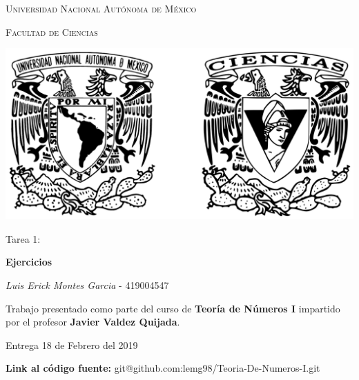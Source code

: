\documentclass[10pt,letterpaper,fleqn]{article}
\begin{document}
\begin{titlepage}
    \centering

    {\scshape\LARGE Universidad Nacional Autónoma de México \par}

    \vspace{1cm}
    {\scshape\Large Facultad de Ciencias\par}
    \vspace{1.5cm}

    \begin{center}
        \includegraphics[scale=.1]{assets/img/logo.png}
    \end{center}

    \vspace{.8 cm}

    {\LARGE Tarea 1: \par}
    {\huge\bfseries Ejercicios \par}

    \vspace{0.5cm}
    \large{\itshape{Luis Erick Montes Garcia}} \small{ - 419004547}

    \vfill

    Trabajo presentado como parte del curso de
    \textbf{Teoría de Números I}
    impartido por el profesor \textbf{Javier Valdez Quijada}. \par
    \vspace{0.1cm}
    {\large Entrega 18 de Febrero del 2019 \par}
    \footnotesize{\textbf{Link al código fuente:} git@github.com:lemg98/Teoria-De-Numeros-I.git}
\end{titlepage}
\end{document}
